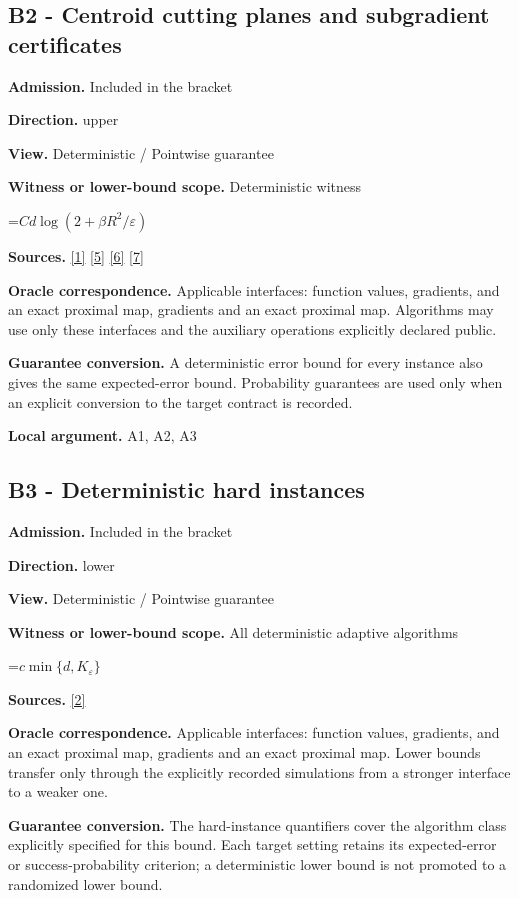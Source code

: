 \documentclass[10pt,a4paper]{article}
\newcommand{\AtlasMath}[1]{\par\begingroup\centering\setbox0=\hbox{$\displaystyle #1$}\ifdim\wd0>1.4\linewidth\typeout{ATLAS WIDE FORMULA: \the\wd0}\fi\ifdim\wd0>\linewidth\resizebox{\linewidth}{!}{\box0}\else\box0\fi\par\endgroup}
\begin{document}
\subsection{B2 - Centroid cutting planes and subgradient certificates}
\textbf{Admission.} Included in the bracket

\textbf{Direction.} upper

\textbf{View.} Deterministic / Pointwise guarantee

\textbf{Witness or lower-bound scope.} Deterministic witness

\AtlasMath{Cd\log(2+\beta R^2/\varepsilon)}
\textbf{Sources.} \href{https://www.tau.ac.il/~becka/FISTA.pdf}{[1]} \href{https://arxiv.org/pdf/1405.4980}{[5]} \href{https://www2.isye.gatech.edu/~nemirovs/MOR_AccuracyCertificates.pdf}{[6]} \href{https://arxiv.org/pdf/2609.20701}{[7]}

\textbf{Oracle correspondence.} Applicable interfaces: function values, gradients, and an exact proximal map, gradients and an exact proximal map. Algorithms may use only these interfaces and the auxiliary operations explicitly declared public.

\textbf{Guarantee conversion.} A deterministic error bound for every instance also gives the same expected-error bound. Probability guarantees are used only when an explicit conversion to the target contract is recorded.

\textbf{Local argument.} A1, A2, A3

\subsection{B3 - Deterministic hard instances}
\textbf{Admission.} Included in the bracket

\textbf{Direction.} lower

\textbf{View.} Deterministic / Pointwise guarantee

\textbf{Witness or lower-bound scope.} All deterministic adaptive algorithms

\AtlasMath{c\min\{d,K_\varepsilon\}}
\textbf{Sources.} \href{https://arxiv.org/pdf/2101.09740v2}{[2]}

\textbf{Oracle correspondence.} Applicable interfaces: function values, gradients, and an exact proximal map, gradients and an exact proximal map. Lower bounds transfer only through the explicitly recorded simulations from a stronger interface to a weaker one.

\textbf{Guarantee conversion.} The hard-instance quantifiers cover the algorithm class explicitly specified for this bound. Each target setting retains its expected-error or success-probability criterion; a deterministic lower bound is not promoted to a randomized lower bound.
\end{document}
